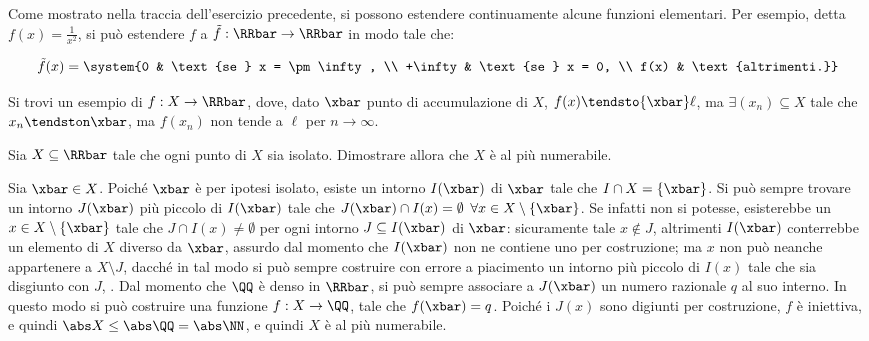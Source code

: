 \documentclass[11pt]{article}
\begin{document}
	\begin{remark} Come mostrato nella traccia dell'esercizio precedente,
		si possono estendere continuamente alcune funzioni elementari.
		Per esempio, detta $f(x) = \frac{1}{x^2}$, si può estendere $f$
		a $\tilde f : \RRbar \to \RRbar$ in modo tale che:
		
		\[ \tilde f(x) = \system {0 & \text{se } x = \pm \infty, \\ +\infty & \text{se } x = 0, \\ f(x) & \text{altrimenti.}} \]
	\end{remark}

	
	\begin{exercise}
		Si trovi un esempio di $f : X \to \RRbar$, dove, dato $\xbar$ punto
		di accumulazione di $X$, $f(x) \tendsto{\xbar} \ell$, ma
		$\exists (x_n) \subseteq X$ tale che $x_n \tendston \xbar$, ma
		$f(x_n)$ non tende a $\ell$ per $n \to \infty$.
	\end{exercise}

	\begin{solution}
		
	\end{solution}

	\begin{exercise}
		Sia $X \subseteq \RRbar$ tale che ogni punto di $X$ sia isolato.
		Dimostrare allora che $X$ è al più numerabile.
	\end{exercise}

	\begin{solution}
		Sia $\xbar \in X$. Poiché $\xbar$ è per ipotesi isolato, esiste
		un intorno $I(\xbar)$ di $\xbar$ tale che $I \cap X = \{\xbar\}$. Si può
		sempre trovare un intorno $J(\xbar)$ più piccolo di $I(\xbar)$ tale
		che $J(\xbar) \cap I(x) = \emptyset$ $\forall x \in X \setminus \{\xbar\}$. Se infatti non si potesse, esisterebbe un $x \in X \setminus \{\xbar\}$ tale che $J \cap I(x) \neq \emptyset$ per ogni
		intorno $J \subseteq I(\xbar)$ di $\xbar$: sicuramente tale $x \notin J$, altrimenti $I(\xbar)$ conterrebbe un elemento di $X$ diverso
		da $\xbar$, assurdo dal momento che $I(\xbar)$ non ne contiene uno
		per costruzione; ma $x$ non può neanche appartenere a $X \setminus J$,
		dacché in tal modo si può sempre costruire con errore a piacimento
		un intorno più piccolo di $I(x)$ tale che sia disgiunto con $J$,
		\Lightning. Dal momento che $\QQ$ è denso in $\RRbar$, si può
		sempre associare a $J(\xbar)$ un numero razionale $q$ al suo interno.
		In questo modo si può costruire una funzione $f : X \to \QQ$,
		tale che $f(\xbar) = q$. Poiché i $J(x)$ sono digiunti per costruzione,
		$f$ è iniettiva, e quindi $\abs X \leq \abs \QQ = \abs \NN$, e quindi
		$X$ è al più numerabile. %
	\end{solution}
\end{document}
